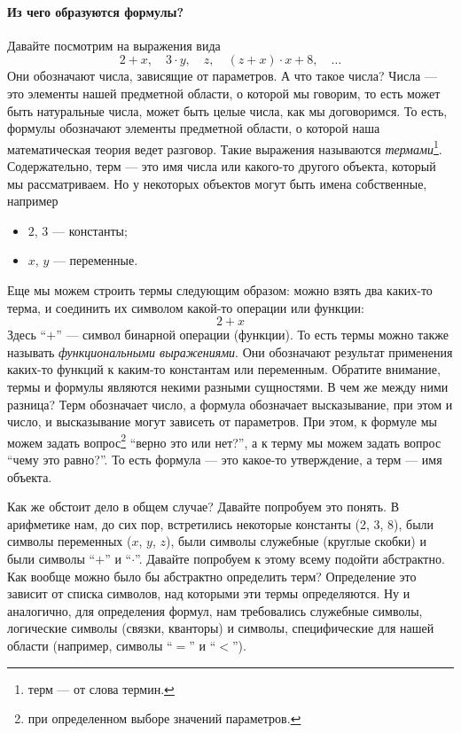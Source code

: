 \paragraph{Из чего образуются формулы?} Давайте посмотрим на выражения вида
$$
    2 + x, \quad 3 \cdot y, \quad z, \quad (z + x) \cdot x + 8, \quad \ldots
$$
Они обозначают числа, зависящие от параметров.
А что такое числа?
Числа --- это элементы нашей предметной области, о которой мы говорим, то есть может быть натуральные числа, может быть целые числа, как мы договоримся.
То есть, формулы обозначают элементы предметной области, о которой наша математическая теория ведет разговор.
Такие выражения называются {\it термами}\footnote{терм --- от слова термин.}.
Содержательно, терм --- это имя числа или какого-то другого объекта, который мы рассматриваем.
Но у некоторых объектов могут быть имена собственные, например
\begin{itemize}
    \item $2$, $3$ --- константы;
    \item $x$, $y$ --- переменные.
\end{itemize}
Еще мы можем строить термы следующим образом: можно взять два каких-то терма, и соединить их символом какой-то операции или функции:
$$
    2 + x
$$
Здесь \enquote{$+$} --- символ бинарной операции (функции).
То есть термы можно также называть {\it функциональными выражениями}.
Они обозначают результат применения каких-то функций к каким-то константам или переменным.
Обратите внимание, термы и формулы являются некими разными сущностями.
В чем же между ними разница?
Терм обозначает число, а формула обозначает высказывание, при этом и число, и высказывание могут зависеть от параметров.
При этом, к формуле мы можем задать вопрос\footnote{при определенном выборе значений параметров.} \enquote{верно это или нет?}, а к терму мы можем задать вопрос \enquote{чему это равно?}.
То есть формула --- это какое-то утверждение, а терм --- имя объекта.

Как же обстоит дело в общем случае?
Давайте попробуем это понять.
В арифметике нам, до сих пор, встретились некоторые константы (2, 3, 8), были символы переменных ($x$, $y$, $z$), были символы служебные (круглые скобки) и были символы \enquote{$+$} и \enquote{$\cdot$}.
Давайте попробуем к этому всему подойти абстрактно.
Как вообще можно было бы абстрактно определить терм?
Определение это зависит от списка символов, над которыми эти термы определяются.
Ну и аналогично, для определения формул, нам требовались служебные символы, логические символы (связки, кванторы) и символы, специфические для нашей области (например, символы \enquote{$=$} и \enquote{$<$}).

